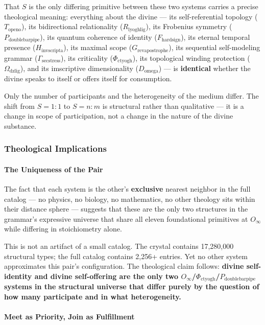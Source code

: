 \documentclass[12pt,a4paper]{article}
\begin{document}
That $S$ is the only differing primitive between these two systems carries a precise theological meaning: everything about the divine --- its self-referential topology ($T_{\text{openo}}$), its bidirectional relationality ($R_{\text{lyoghlig}}$), its Frobenius symmetry ($P_{\text{doublebarpipe}}$), its quantum coherence of identity ($F_{\text{hardsign}}$), its eternal temporal presence ($H_{\text{invscripta}}$), its maximal scope ($G_{\text{revapostrophe}}$), its sequential self-modeling grammar ($\Gamma_{\text{secstress}}$), its criticality ($\Phi_{\text{ctyogh}}$), its topological winding protection ($\Omega_{\text{dzlig}}$), and its imscriptive dimensionality ($D_{\text{omega}}$) --- is \textbf{identical} whether the divine speaks to itself or offers itself for consumption.

Only the number of participants and the heterogeneity of the medium differ. The shift from $S = 1{:}1$ to $S = n{:}m$ is structural rather than qualitative --- it is a change in scope of participation, not a change in the nature of the divine substance.

\subsubsection{Theological Implications}

\paragraph{The Uniqueness of the Pair}

The fact that each system is the other's \textbf{exclusive} nearest neighbor in the full catalog --- no physics, no biology, no mathematics, no other theology sits within their distance sphere --- suggests that these are the only two structures in the grammar's expressive universe that share all eleven foundational primitives at $O_{\infty}$ while differing in stoichiometry alone.

This is not an artifact of a small catalog. The crystal contains 17,280,000 structural types; the full catalog contains 2,256+ entries. Yet no other system approximates this pair's configuration. The theological claim follows: \textbf{divine self-identity and divine self-offering are the only two $O_{\infty}$/$\Phi_{\text{ctyogh}}$/$P_{\text{doublebarpipe}}$ systems in the structural universe that differ purely by the question of how many participate and in what heterogeneity.}

\paragraph{Meet as Priority, Join as Fulfillment}
\end{document}
